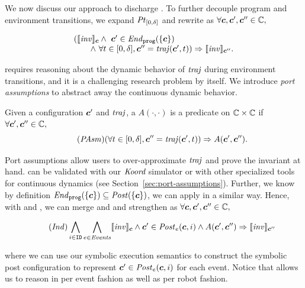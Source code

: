 We now discuss our approach to discharge .
To further decouple program and environment transitions,
we expand $\mathit{Pt}_{[0,\delta]}$  and rewrite  as $\forall \mathit{\boldsymbol{c}}, \mathit{\boldsymbol{c}}', \mathit{\boldsymbol{c}}'' \in \mathbb{C},$
\begin{small}
\begin{equation}\label{po:ind-hyp-traj}
\begin{array}{l}
(\llbracket\mathit{inv}\rrbracket_{\mathit{\boldsymbol{c}}} \land\ \mathit{\boldsymbol{c}}' \in \mathit{End}_{\mathtt{prog}}(\left\{\mathit{\boldsymbol{c}}\right\})\\
\qquad  \land\ \forall t \in [0, \delta], \mathit{\boldsymbol{c}}'' = \mathit{traj}(\mathit{\boldsymbol{c}}', t)) \Rightarrow \llbracket\mathit{inv}\rrbracket_{\mathit{\boldsymbol{c}}''}.
\end{array}
\end{equation}
\end{small}%
 requires reasoning about the dynamic behavior of $\mathit{traj}$ during environment transitions, and it is a challenging research problem by itself. We introduce {\em port assumptions\/} to abstract away the continuous dynamic behavior.
%
%
%
\begin{definition}
Given a configuration $\mathit{\boldsymbol{c}}'$ and $\mathit{traj}$, a \emph{\portasum} $A(\cdot, \cdot)$ is a predicate on $\mathbb{C}\times \mathbb{C}$ if  $\forall \mathit{\boldsymbol{c}}', \mathit{\boldsymbol{c}}'' \in \mathbb{C},$
\begin{equation}\label{po:port-asm}\tag{\textit{PAsm}}
(\forall t \in [0,\delta], \gconfig'' = \traj(\gconfig', t)) \Rightarrow A(\gconfig', \gconfig'').
\end{equation}
\end{definition}
Port assumptions allow users to over-approximate $\mathit{traj}$ and prove the invariant at hand.
 can be validated with our $\emph{Koord}$ simulator or with other specialized tools for continuous dynamics (see Section~\ref{sec:port-assumptions}).
Further, we know by definition $\mathit{End}_{\mathtt{prog}}(\left\{\mathit{\boldsymbol{c}}\right\}) \subseteq \mathit{Post}(\left\{\mathit{\boldsymbol{c}}\right\})$,
we can apply  in a similar way.
Hence, with  and ,
we can merge  and  and strengthen as
$\forall \mathit{\boldsymbol{c}}, \mathit{\boldsymbol{c}}', \mathit{\boldsymbol{c}}'' \in \mathbb{C},$
\begin{small}
\begin{equation}\label{po:ind}\tag{\textit{Ind}}
\bigwedge_{i\in \UINS} \bigwedge_{\Ev \in \Event} \eec{\Inv}{\gconfig} \land \gconfig' \in \Post_\Ev(\gconfig, i)
\land A(\gconfig', \gconfig'')
\Rightarrow \eec{\Inv}{\gconfig''}
\end{equation}
\end{small}%
where we can use our \K symbolic execution semantics to construct the symbolic post configuration
to represent $\mathit{\boldsymbol{c}}' \in \mathit{Post}_e(\mathit{\boldsymbol{c}}, i)$ for each event.
Notice that  allows us to reason in per event fashion as well as per robot fashion.

